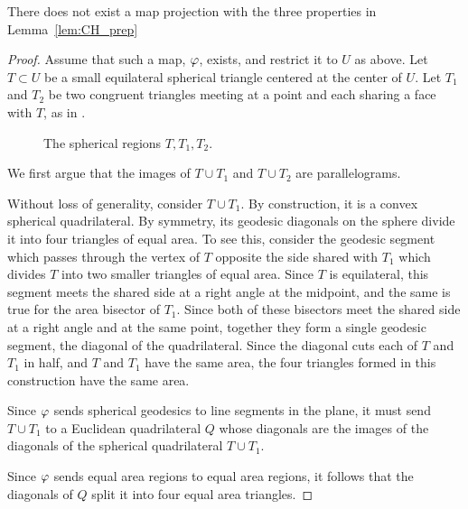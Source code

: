\begin{theorem}
	There does not exist a map projection with the three properties in Lemma~\ref{lem:CH_prep}
\end{theorem}
\begin{proof}
	Assume that such a map, $\varphi$, exists, and restrict 
	it to $U$ as above. Let $T\subset U$ be a 
	small equilateral spherical  triangle centered at 
	the center of $U$. Let $T_1$ and $T_2$ be two 
	congruent triangles meeting at a point and 
	each sharing a face with $T$, as in .

\begin{figure}[!htb]
	\centering
	
	\caption{The spherical regions $T,T_1,T_2$.}
	\label{fig:sphtris}
\end{figure}












We first argue that the images of $T\cup T_1$ and $T\cup T_2$ are parallelograms.

Without loss of generality, consider $T\cup T_1$.  By construction, it is a 
convex spherical quadrilateral. By symmetry, its geodesic 
diagonals on the sphere divide it into four triangles of equal area.  To see this, consider the geodesic segment which passes through the vertex of $T$ opposite the side shared with $T_1$ which divides $T$ into two smaller triangles of equal area.  Since $T$ is equilateral, this segment meets the shared side at a right angle at the midpoint, and the same is true for the area bisector of $T_1$.  Since both of these bisectors meet the shared side at a right angle and at the same point, together they form a single geodesic segment, the diagonal of the quadrilateral.  Since the diagonal cuts each of $T$ and $T_1$ in half, and $T$ and $T_1$ have the same area, the four triangles formed in this construction have the same area.


		Since $\varphi$ sends spherical geodesics to line segments in the plane, it must send 
		$T\cup T_1$ to a Euclidean quadrilateral $Q$ whose diagonals 
		are the images of the diagonals of the spherical quadrilateral $T\cup T_1$.
		
		 Since 
		$\varphi$ sends equal area regions to equal area 
		regions, it follows that the diagonals 
		of $Q$ split it into four equal area triangles.
		

\end{proof}

